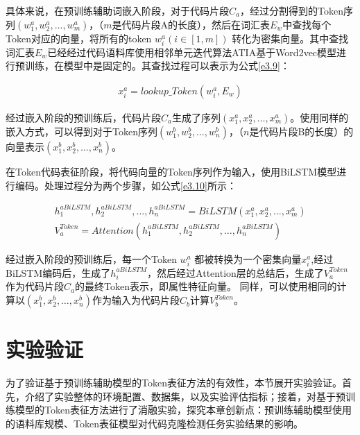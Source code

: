 具体来说，在预训练辅助词嵌入阶段，对于代码片段$C_{a}$，经过分割得到的Token序列$\left( w_{1}^{a},w_{2}^{a},\ldots,w_{m}^{a}\right)$，（$m$是代码片段A的长度），然后在词汇表$E_{w}$中查找每个Token对应的向量，将所有的token $w_{i}^{a} \left(i \in [1,m]\right)$ 转化为密集向量。其中查找词汇表$E_{w}$已经经过代码语料库使用相邻单元迭代算法ATIA基于Word2vec模型进行预训练，在模型中是固定的。其查找过程可以表示为公式\ref{e3.9}：

\begin{equation}\label{e3.9}
  \begin{split}
  x_{i}^{a} = lookup\_Token \left(w_{i}^{a} ,E_{w} \right)
  \end{split}
\end{equation}

经过嵌入阶段的预训练后，代码片段$C_{a}$生成了序列$\left( x_{1}^{a},x_{2}^{a},\ldots,x_{m}^{a}\right)$。使用同样的嵌入方式，可以得到对于Token序列$\left( w_{1}^{b},w_{2}^{b},\ldots,w_{n}^{b}\right)$，（$n$是代码片段B的长度）的向量表示$\left( x_{1}^{b},x_{2}^{b},\ldots,x_{n}^{b} \right)$。

在Token代码表征阶段，将代码向量的Token序列作为输入，使用BiLSTM模型进行编码。处理过程分为两个步骤，如公式\ref{e3.10}所示：

\begin{equation}\label{e3.10}
  \begin{split}
    h_{1}^{aBiLSTM},h_{2}^{aBiLSTM},\ldots,h_{n}^{aBiLSTM} = BiLSTM \left(x_{1}^{a},x_{2}^{a},\ldots,x_{m}^{a}\right) \\
    V_{a}^{Token} = Attention \left( h_{1}^{aBiLSTM},h_{2}^{aBiLSTM},\ldots,h_{n}^{aBiLSTM} \right)
  \end{split}
\end{equation}

经过嵌入阶段的预训练后，每一个Token $w_{i}^{a}$ 都被转换为一个密集向量$x_{i}^{a}$,经过BiLSTM编码后，生成了$h_{i}^{aBiLSTM}$，然后经过Attention层的总结后，生成了$V_{a}^{Token}$作为代码片段$C_{a}$的最终Token表示，即属性特征向量。
同样，可以使用相同的计算以$\left( x_{1}^{b},x_{2}^{b},\ldots,x_{n}^{b} \right)$作为输入为代码片段$C_{b}$计算$V_{b}^{Token}$。

\section{实验验证}
\label{sec:TokenExperiment}
为了验证基于预训练辅助模型的Token表征方法的有效性，本节展开实验验证。首先，介绍了实验整体的环境配置、数据集，以及实验评估指标；接着，对基于预训练模型的Token表征方法进行了消融实验，探究本章创新点：预训练辅助模型使用的语料库规模、Token表征模型对代码克隆检测任务实验结果的影响。

